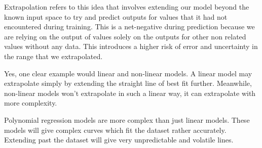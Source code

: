 \documentclass[12pt]{article}
\begin{document}
\begin{enumerate}


Extrapolation refers to this idea that involves extending our model beyond the known input space to try and predict outputs for values that it had not encountered during training. This is a net-negative during prediction because we are relying on the output of values solely on the outputs for other non related values without any data. This introduces a higher risk of error and uncertainty in the range that we extrapolated.


Yes, one clear example would linear and non-linear models. A linear model may extrapolate simply by extending the straight line of best fit further. Meanwhile, non-linear models won't extrapolate in such a linear way, it can extrapolate with more complexity.


Polynomial regression models are more complex than just linear models. These models will give complex curves which fit the dataset rather accurately. Extending past the dataset will give very unpredictable and volatile lines.

\end{enumerate}
\end{document}
